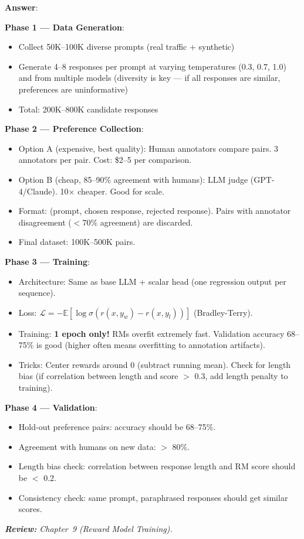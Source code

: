 \begin{questionbox}
\textbf{Answer}:

\textbf{Phase 1 --- Data Generation}:

\begin{itemize}
  \item Collect 50K--100K diverse prompts (real traffic + synthetic)
  \item Generate 4--8 responses per prompt at varying temperatures (0.3, 0.7, 1.0) and from multiple models (diversity is key --- if all responses are similar, preferences are uninformative)
  \item Total: 200K--800K candidate responses
\end{itemize}

\textbf{Phase 2 --- Preference Collection}:

\begin{itemize}
  \item Option A (expensive, best quality): Human annotators compare pairs. 3 annotators per pair. Cost: \$2--5 per comparison.
  \item Option B (cheap, 85--90\% agreement with humans): LLM judge (GPT-4/Claude). 10$\times$ cheaper. Good for scale.
  \item Format: (prompt, chosen response, rejected response). Pairs with annotator disagreement ($<$70\% agreement) are discarded.
  \item Final dataset: 100K--500K pairs.
\end{itemize}

\textbf{Phase 3 --- Training}:

\begin{itemize}
  \item Architecture: Same as base LLM + scalar head (one regression output per sequence).
  \item Loss: $\mathcal{L} = -\mathbb{E}[\log\sigma(r(x,y_w) - r(x,y_l))]$ (Bradley-Terry).
  \item Training: \textbf{1 epoch only!} RMs overfit extremely fast. Validation accuracy 68--75\% is good (higher often means overfitting to annotation artifacts).
  \item Tricks: Center rewards around 0 (subtract running mean). Check for length bias (if correlation between length and score $>$ 0.3, add length penalty to training).
\end{itemize}

\textbf{Phase 4 --- Validation}:

\begin{itemize}
  \item Hold-out preference pairs: accuracy should be 68--75\%.
  \item Agreement with humans on new data: $>$ 80\%.
  \item Length bias check: correlation between response length and RM score should be $<$ 0.2.
  \item Consistency check: same prompt, paraphrased responses should get similar scores.
\end{itemize}

\emph{\textbf{Review:} Chapter~9 (Reward Model Training).}
\end{questionbox}

